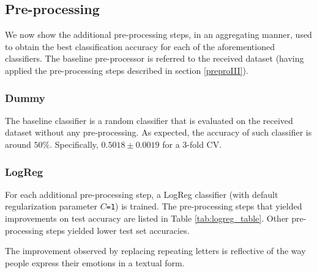 \subsection{Pre-processing}
We now show the additional pre-processing steps, in an aggregating manner, used to obtain the best classification accuracy for each of the aforementioned classifiers.
The baseline pre-processor is referred to the received dataset (having applied the pre-processing steps described in section \ref{preproIII}).
\subsubsection{Dummy}
The baseline classifier is a random classifier that is evaluated on the received dataset without any pre-processing.
As expected, the accuracy of such classifier is around $50\%$. Specifically, $0.5018 \pm 0.0019$ for a 3-fold CV.
\subsubsection{LogReg}
For each additional pre-processing step, a LogReg classifier (with default regularization parameter \texttt{$C$=1}) is trained. 
The pre-processing steps that yielded improvements on test accuracy are listed in Table \ref{tab:logreg_table}. 
Other pre-processing steps yielded lower test set accuracies.
\vspace{-0.19cm}
\begin{table}[H]
\centering
{}
\caption{\label{tab:logreg_table}Best pre-processing steps for default LogReg.}
\end{table}
The improvement observed by replacing repeating letters is reflective of the way people express their emotions in a textual form.
\vspace{-0.1cm}
